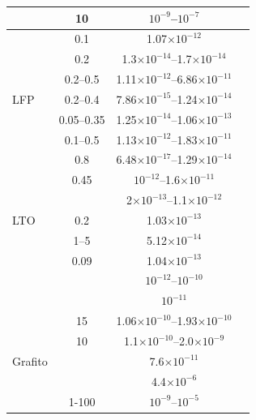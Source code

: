\begin{table}[h!]
{\begin{tabular}{l c c r}
            & 10 & $10^{-9}$--$10^{-7}$ & \cite{marzec2002conduction} \\
        \midrule
            & 0.1 & 1.07$\times10^{-12}$ & \cite{weng2020situ} \\
            & 0.2 & 1.3$\times10^{-14}$--1.7$\times10^{-14}$ & \cite{budumuru2018mn} \\
            & 0.2--0.5 & 1.11$\times10^{-12}$--6.86$\times10^{-11}$ & \cite{li2020electrochemical} \\
        LFP & 0.2--0.4 & 7.86$\times10^{-15}$--1.24$\times10^{-14}$ & \cite{li2020concentration} \\
            & 0.05--0.35 & 1.25$\times10^{-14}$--1.06$\times10^{-13}$ & \cite{zhang2019improving} \\
            & 0.1--0.5 & 1.13$\times10^{-12}$--1.83$\times10^{-11}$ & \cite{yan2020nickel} \\
            & 0.8 & 6.48$\times10^{-17}$--1.29$\times10^{-14}$ & \cite{prosini2002determination} \\
        \midrule
            & 0.45 & $10^{-12}$--1.6$\times10^{-11}$ & \cite{takami2011lithium} \\
            &  & 2$\times10^{-13}$--1.1$\times10^{-12}$ & \cite{shi2020crystal} \\
        LTO & 0.2 & 1.03$\times10^{-13}$ & \cite{kawade2018surface} \\
            & 1--5 & 5.12$\times10^{-14}$ & \cite{wang2019unveiling} \\
            & 0.09 & 1.04$\times10^{-13}$ & \cite{wang2018synthesis} \\
            &  & $10^{-12}$--$10^{-10}$ & \cite{rho2004li} \\
        \midrule
                &  & $10^{-11}$ & \cite{adams2019temperature} \\
                & 15 & 1.06$\times10^{-10}$--1.93$\times10^{-10}$ & \cite{gruet2018electrochemical} \\
                & 10 & 1.1$\times10^{-10}$--2.0$\times10^{-9}$ & \cite{cabanero2018direct} \\
        Grafito &  & 7.6$\times10^{-11}$ & \cite{umegaki2017li} \\
                &  & 4.4$\times10^{-6}$ & \cite{persson2010lithium} \\
                & 1-100 & $10^{-9}$--$10^{-5}$ & \cite{funabiki1998impedance} \\
        \bottomrule
    \end{tabular}
    }{}
    \label{t:dataset}
\end{table}
